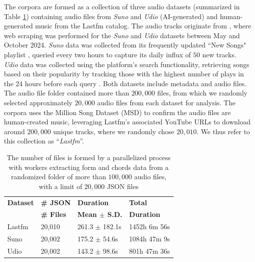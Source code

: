 \documentclass{article}
\begin{document}
The corpora are formed as a collection of three audio datasets (summarized in Table \ref{tab:datasets}) containing audio files from \textit{Suno} and \textit{Udio} (AI-generated) and human-generated music from the Lastfm catalog. The audio tracks originate from \citep{cros2025ai}, where web scraping was performed for the \textit{Suno} and \textit{Udio} datasets between May and October 2024. \textit{Suno} data was collected from its frequently updated ``New Songs" playlist , queried every two hours to capture its daily influx of $50$ new tracks. \textit{Udio} data was collected using the platform's search functionality, retrieving songs based on their popularity by tracking those with the highest number of plays in the 24 hours before each query \citep{cros2025ai}. Both datasets include metadata and audio files. The audio file folder contained more than $200,000$ files, from which we randomly selected approximately $20,000$ audio files from each dataset for analysis. The corpora uses the Million Song Dataset (MSD) \citep{Bertin-Mahieux2011} to confirm the audio files are human-created music, leveraging Lastfm's associated YouTube URLs to download around $200,000$ unique tracks, where we randomly chose $20,010$. We thus refer to this collection as ``\textit{Lastfm}''.


\begin{table}[htpb]
\centering
\footnotesize
\begin{tabular}{llll}
\toprule
\textbf{Dataset} & \textbf{\# JSON} & \textbf{Duration} & \textbf{Total} \\
& \textbf{\# Files} & \textbf{Mean $\pm$ S.D.} & \textbf{Duration} \\
\midrule
    Lastfm & 20,010 & 261.3 $\pm$ 182.1s & 1452h 6m 56s \\
    Suno & 20,002 & 175.2 $\pm$ 54.6s & 1084h 47m 9s \\
    Udio & 20,002 & 143.2 $\pm$ 98.6s & 801h 47m 36s \\
\bottomrule
\end{tabular}
\caption{The number of files is formed by a parallelized process with workers extracting form and chords data from a randomized folder of more than $100,000$ audio files, with a limit of $20,000$ JSON files}
\label{tab:datasets}
\end{table}
\end{document}
